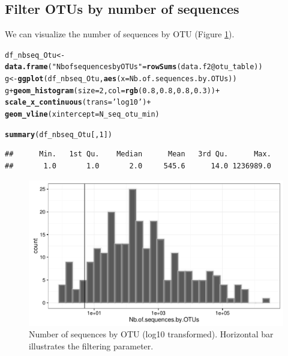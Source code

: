 \documentclass[12pt]{article}\usepackage[]{graphicx}\usepackage[]{color}
\makeatletter
\def\maxwidth{ %
  \ifdim\Gin@nat@width>\linewidth
    \linewidth
  \else
    \Gin@nat@width
  \fi
}
\newcommand{\hlnum}[1]{\textcolor[rgb]{0.686,0.059,0.569}{#1}}%
\newcommand{\hlstr}[1]{\textcolor[rgb]{0.192,0.494,0.8}{#1}}%
\newcommand{\hlopt}[1]{\textcolor[rgb]{0,0,0}{#1}}%
\newcommand{\hlstd}[1]{\textcolor[rgb]{0.345,0.345,0.345}{#1}}%
\newcommand{\hlkwb}[1]{\textcolor[rgb]{0.69,0.353,0.396}{#1}}%
\newcommand{\hlkwc}[1]{\textcolor[rgb]{0.333,0.667,0.333}{#1}}%
\newcommand{\hlkwd}[1]{\textcolor[rgb]{0.737,0.353,0.396}{\textbf{#1}}}%
\newenvironment{kframe}{%
 \def\at@end@of@kframe{}%
 \ifinner\ifhmode%
  \def\at@end@of@kframe{\end{minipage}}%
  \begin{minipage}{\columnwidth}%
 \fi\fi%
 \def\FrameCommand##1{\hskip\@totalleftmargin \hskip-\fboxsep
 \colorbox{shadecolor}{##1}\hskip-\fboxsep
     \hskip-\linewidth \hskip-\@totalleftmargin \hskip\columnwidth}%
 \MakeFramed {\advance\hsize-\width
   \@totalleftmargin\z@ \linewidth\hsize
   \@setminipage}}%
 {\par\unskip\endMakeFramed%
 \at@end@of@kframe}
\newenvironment{knitrout}{}{} %
\numberwithin{figure}{section}
\makeatother
\begin{document}
 \subsection{Filter OTUs by number of sequences}

 We can visualize the number of sequences by OTU (Figure \ref{fig:nbseq_Otu}).

\begin{knitrout}\small
{}\color{fgcolor}\begin{kframe}
\begin{alltt}
\hlstd{df_nbseq_Otu} \hlkwb{<-} \hlkwd{data.frame}\hlstd{(}\hlstr{"Nb of sequences by OTUs"} \hlstd{=} \hlkwd{rowSums}\hlstd{(data.f2}\hlopt{@}\hlkwc{otu_table}\hlstd{))}
\hlstd{g} \hlkwb{<-} \hlkwd{ggplot}\hlstd{(df_nbseq_Otu,} \hlkwd{aes}\hlstd{(}\hlkwc{x} \hlstd{= Nb.of.sequences.by.OTUs))}
\hlstd{g} \hlopt{+} \hlkwd{geom_histogram}\hlstd{(}\hlkwc{size} \hlstd{=} \hlnum{2}\hlstd{,} \hlkwc{col} \hlstd{=} \hlkwd{rgb}\hlstd{(}\hlnum{0.8}\hlstd{,} \hlnum{0.8}\hlstd{,} \hlnum{0.8}\hlstd{,} \hlnum{0.3}\hlstd{))} \hlopt{+}
  \hlkwd{scale_x_continuous}\hlstd{(}\hlkwc{trans} \hlstd{=} \hlstr{'log10'}\hlstd{)} \hlopt{+}
  \hlkwd{geom_vline}\hlstd{(}\hlkwc{xintercept}\hlstd{= N_seq_otu_min)}
\end{alltt}


{\ttfamily\noindent\itshape\color{messagecolor}{\#\# `stat\_bin()` using `bins = 30`. Pick better value with `binwidth`.}}\begin{alltt}
\hlkwd{summary}\hlstd{(df_nbseq_Otu[,} \hlnum{1}\hlstd{])}
\end{alltt}
\begin{verbatim}
##      Min.   1st Qu.    Median      Mean   3rd Qu.      Max. 
##       1.0       1.0       2.0     545.6      14.0 1236989.0
\end{verbatim}
\end{kframe}\begin{figure}

{\centering \includegraphics[width=\maxwidth]{figure/nbseq_Otu-1} 

}

\caption[Number of sequences by OTU (log10 transformed)]{Number of sequences by OTU (log10 transformed). Horizontal bar illustrates the filtering parameter.}\label{fig:nbseq_Otu}
\end{figure}


\end{knitrout}
\end{document}
